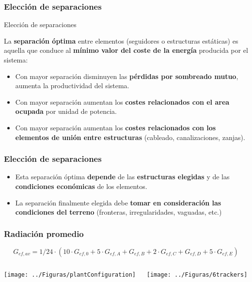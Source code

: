 \documentclass[xcolor=dvipsnames]{beamer}
\begin{document}
\begin{frame}
\frametitle{Elección de separaciones}
\begin{block}
{Elección de separaciones}

La \textbf{separación óptima} entre elementos (seguidores o estructuras
estáticas) es aquella que conduce al \textbf{mínimo valor del coste
de la energía} producida por el sistema:
\begin{itemize}
\item Con mayor separación disminuyen las \textbf{pérdidas por sombreado
mutuo}, aumenta la productividad del sistema.
\item Con mayor separación aumentan los \textbf{costes relacionados con
el area ocupada} por unidad de potencia.
\item Con mayor separación aumentan los \textbf{costes relacionados con
los elementos de unión entre estructuras} (cableado, canalizaciones,
zanjas).
\end{itemize}
\end{block}

\end{frame}

\begin{frame}
\frametitle{Elección de separaciones}
\begin{block}
{}
\begin{itemize}
\item Esta separación óptima \textbf{depende} de las \textbf{estructuras
elegidas} y de las \textbf{condiciones económicas} de los elementos. 
\item La separación finalmente elegida debe \textbf{tomar en consideración
las condiciones del terreno} (fronteras, irregularidades, vaguadas,
etc.)
\end{itemize}
\end{block}

\end{frame}



\begin{frame}
  \frametitle{Radiación promedio}

  \begin{equation*}
    G_{ef, av} = 1/24 \cdot \left( 10 \cdot G_{ef,0} + 5 \cdot G_{ef,A}
      + G_{ef,B} + 2 \cdot G_{ef,C} + G_{ef,D} + 5 \cdot G_{ef,E} \right)
  \end{equation*}

  \begin{columns}

    \begin{column}{4cm}
      \begin{center}
        \texttt{[image: ../Figuras/plantConfiguration]}
      \end{center}
    \end{column}

    \begin{column}{6cm}
      \texttt{[image: ../Figuras/6trackers]}

    \end{column}
  \end{columns}


\end{frame}
\end{document}
